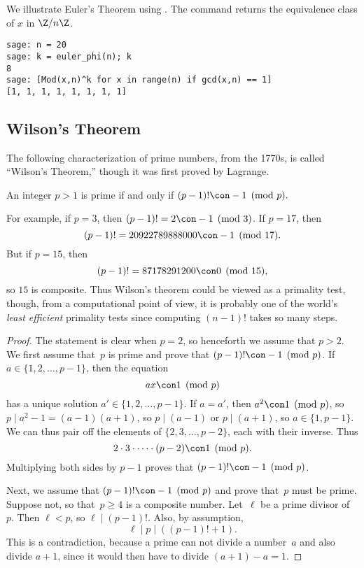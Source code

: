 \begin{sg}
We illustrate Euler's Theorem using \sage.
The  command  returns the equivalence
class of $x$ in $\Z/n\Z$.
\begin{verbatim}
sage: n = 20
sage: k = euler_phi(n); k
8
sage: [Mod(x,n)^k for x in range(n) if gcd(x,n) == 1]
[1, 1, 1, 1, 1, 1, 1, 1]
\end{verbatim}
\end{sg}


\subsection{Wilson's Theorem}
The following characterization of prime numbers, from the 1770s, is
called ``Wilson's Theorem,'' though it was first proved by
Lagrange.
\begin{proposition}\label{prop:wilson}
An integer $p>1$ is prime if and only if
$(p-1)! \con -1 \pmod{p}.$
\end{proposition}
For example,
if $p=3$, then $(p-1)! = 2\con -1\pmod{3}$.
If $p=17$, then
$$(p-1)! = 20922789888000 \con -1\pmod{17}.$$
But if $p=15$, then
$$(p-1)! = 87178291200 \con 0 \pmod{15},$$
so $15$ is composite.  Thus Wilson's theorem could be viewed
as a primality test, though, from a computational point of view,
it is probably one of the world's {\em least efficient}
primality tests since computing $(n-1)!$ takes so many steps.
\begin{proof}
The statement is clear when $p=2$, so henceforth we assume
that $p>2$.
We first assume that~$p$ is prime and prove that
$(p-1)! \con -1\pmod{p}$.  If $a\in\{1,2,\ldots,p-1\}$, then
the equation
$$
  ax\con 1\pmod{p}
$$
has a unique solution $a'\in\{1,2,\ldots,p-1\}$.
If $a=a'$, then $a^2\con 1\pmod{p}$, so
$p\mid a^2-1 = (a-1)(a+1)$, so
$p\mid (a-1)$ or $p\mid (a+1)$, so $a\in\{1,p-1\}$.
We can thus pair off the elements of
$\{2,3,\ldots,p-2\}$,
each with their inverse.
Thus
$$
  2\cdot 3 \cdot \cdots \cdot (p-2) \con 1\pmod{p}.
$$
Multiplying both sides by $p-1$ proves that
$(p-1)! \con -1\pmod{p}$.

Next, we assume that $(p-1)! \con -1\pmod{p}$ and
prove that~$p$ must be prime.  Suppose not, so that~$p\geq 4$
is a composite number.  Let~$\ell$ be a prime divisor
of~$p$.  Then $\ell<p$, so $\ell\mid (p-1)!$.  Also,
by assumption,
$$
  \ell \mid p \mid ((p-1)! + 1).
$$
This is a contradiction, because a prime can not divide a number~$a$ and
also divide $a+1$, since it would then have to divide $(a+1) - a=1$.
\end{proof}

